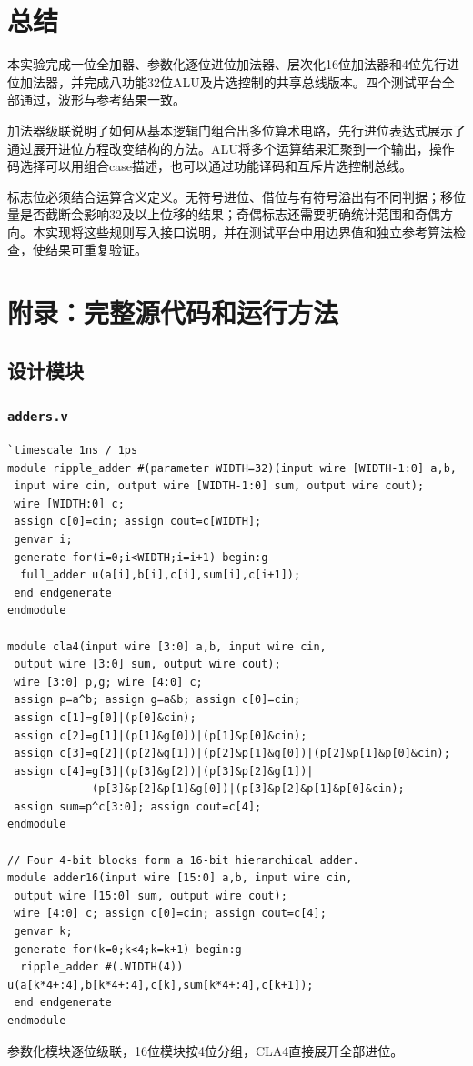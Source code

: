 \documentclass[12pt,a4paper]{ctexart}
\begin{document}
\section{总结}
本实验完成一位全加器、参数化逐位进位加法器、层次化16位加法器和4位先行进位加法器，并完成八功能32位ALU及片选控制的共享总线版本。四个测试平台全部通过，波形与参考结果一致。

加法器级联说明了如何从基本逻辑门组合出多位算术电路，先行进位表达式展示了通过展开进位方程改变结构的方法。ALU将多个运算结果汇聚到一个输出，操作码选择可以用组合case描述，也可以通过功能译码和互斥片选控制总线。

标志位必须结合运算含义定义。无符号进位、借位与有符号溢出有不同判据；移位量是否截断会影响32及以上位移的结果；奇偶标志还需要明确统计范围和奇偶方向。本实现将这些规则写入接口说明，并在测试平台中用边界值和独立参考算法检查，使结果可重复验证。

\clearpage
\section*{附录：完整源代码和运行方法}

\subsection*{设计模块}
\subsubsection*{\texttt{adders.v}}
\begin{lstlisting}
`timescale 1ns / 1ps
module ripple_adder #(parameter WIDTH=32)(input wire [WIDTH-1:0] a,b,
 input wire cin, output wire [WIDTH-1:0] sum, output wire cout);
 wire [WIDTH:0] c;
 assign c[0]=cin; assign cout=c[WIDTH];
 genvar i;
 generate for(i=0;i<WIDTH;i=i+1) begin:g
  full_adder u(a[i],b[i],c[i],sum[i],c[i+1]);
 end endgenerate
endmodule

module cla4(input wire [3:0] a,b, input wire cin,
 output wire [3:0] sum, output wire cout);
 wire [3:0] p,g; wire [4:0] c;
 assign p=a^b; assign g=a&b; assign c[0]=cin;
 assign c[1]=g[0]|(p[0]&cin);
 assign c[2]=g[1]|(p[1]&g[0])|(p[1]&p[0]&cin);
 assign c[3]=g[2]|(p[2]&g[1])|(p[2]&p[1]&g[0])|(p[2]&p[1]&p[0]&cin);
 assign c[4]=g[3]|(p[3]&g[2])|(p[3]&p[2]&g[1])|
             (p[3]&p[2]&p[1]&g[0])|(p[3]&p[2]&p[1]&p[0]&cin);
 assign sum=p^c[3:0]; assign cout=c[4];
endmodule

// Four 4-bit blocks form a 16-bit hierarchical adder.
module adder16(input wire [15:0] a,b, input wire cin,
 output wire [15:0] sum, output wire cout);
 wire [4:0] c; assign c[0]=cin; assign cout=c[4];
 genvar k;
 generate for(k=0;k<4;k=k+1) begin:g
  ripple_adder #(.WIDTH(4)) u(a[k*4+:4],b[k*4+:4],c[k],sum[k*4+:4],c[k+1]);
 end endgenerate
endmodule
\end{lstlisting}
参数化模块逐位级联，16位模块按4位分组，CLA4直接展开全部进位。
\end{document}
